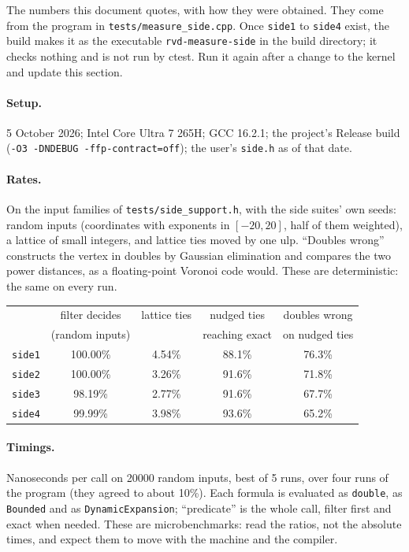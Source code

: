 \documentclass[11pt,a4paper]{article}
\newcommand{\code}[1]{\texttt{#1}}
\theoremstyle{definition}
\theoremstyle{remark}
\begin{document}
The numbers this document quotes, with how they were obtained. They come from the program in
\code{tests/measure\_side.cpp}. Once \code{side1} to \code{side4} exist, the build makes it as the
executable \code{rvd-measure-side} in the build directory; it checks nothing and is not run by
ctest. Run it again after a change to the kernel and update this section.

\paragraph{Setup.} 5 October 2026; Intel Core Ultra 7 265H; GCC 16.2.1; the project's Release
build (\code{-O3 -DNDEBUG -ffp-contract=off}); the user's \code{side.h} as of that date.

\paragraph{Rates.} On the input families of \code{tests/side\_support.h}, with the side suites'
own seeds: random inputs (coordinates with exponents in $[-20, 20]$, half of them weighted), a
lattice of small integers, and lattice ties moved by one ulp. ``Doubles wrong'' constructs the
vertex in doubles by Gaussian elimination and compares the two power distances, as a
floating-point Voronoi code would. These are deterministic: the same on every run.

\begin{center}
\begin{tabular}{@{}lcccc@{}}
  \toprule
  & filter decides & lattice ties & nudged ties & doubles wrong \\
  & (random inputs) & & reaching exact & on nudged ties \\
  \midrule
  \code{side1} & 100.00\% & 4.54\% & 88.1\% & 76.3\% \\
  \code{side2} & 100.00\% & 3.26\% & 91.6\% & 71.8\% \\
  \code{side3} & 98.19\%  & 2.77\% & 91.6\% & 67.7\% \\
  \code{side4} & 99.99\%  & 3.98\% & 93.6\% & 65.2\% \\
  \bottomrule
\end{tabular}
\end{center}

\paragraph{Timings.} Nanoseconds per call on 20000 random inputs, best of 5 runs, over four runs
of the program (they agreed to about 10\%). Each formula is evaluated as \code{double}, as
\code{Bounded} and as \code{DynamicExpansion}; ``predicate'' is the whole call, filter first and
exact when needed. These are microbenchmarks: read the ratios, not the absolute times, and expect
them to move with the machine and the compiler.
\end{document}
